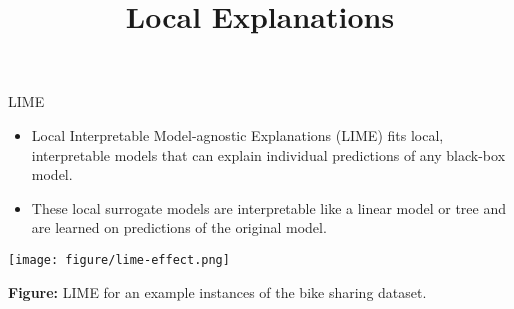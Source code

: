 \documentclass[11pt,compress,t,notes=noshow, xcolor=table]{beamer}
\title{Local Explanations}
\institute{\href{https://compstat-lmu.github.io/lecture_i2ml/}{compstat-lmu.github.io/lecture\_i2ml}}
\date{}
\begin{document}
	
	
	
	
	
	
	
	
	


\begin{vbframe}{LIME}
\begin{itemize}
        \item  Local Interpretable Model-agnostic Explanations (LIME) fits local, interpretable models that can explain individual predictions of any black-box model.
        \item  These local surrogate models are interpretable like a linear model or tree  and are learned on predictions of the original model. 
\end{itemize}

\begin{center}
\texttt{[image: figure/lime-effect.png]}
\end{center}   

\textbf{Figure:} LIME for an example instances of the bike sharing dataset.
\end{vbframe}
\end{document}
